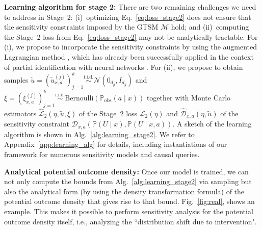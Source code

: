 \documentclass{article} %
\theoremstyle{definition}
\theoremstyle{plain}
\begin{document}
\textbf{Learning algorithm for stage 2:} There are two remaining challenges we need to address in Stage~2: (i)~optimizing Eq.~\eqref{eq:loss_stage2} does not ensure that the sensitivity constraints imposed by the GTSM $\mathcal{M}$ hold; and (ii)~computing the Stage~2 loss from Eq.~\eqref{eq:loss_stage2} may not be analytically tractable. For (i), we propose to incorporate the sensitivity constraints by using the augmented Lagrangian method \citep{Nocedal.2006}, which has already been successfully applied in the context of partial identification with neural networks \citep{Padh.2023}. For (ii), we propose to obtain samples $\widetilde{u} = (\widetilde{u}^{(j)}_{x, a})_{j=1}^k \overset{\text{i.i.d.}}{\sim} \mathcal{N}(0_{d_y}, I_{d_y})$ and $\xi = (\xi^{(j)}_{x, a})_{j=1}^k \overset{\text{i.i.d.}}{\sim} \mathrm{Bernoulli}(\mathbb{P}_\mathrm{obs}(a \mid x))$ together with Monte Carlo estimators $\hat{\mathcal{L}}_2(\eta, \widetilde{u}, \xi)$ of the Stage~2 loss $\mathcal{L}_2(\eta)$ and $\hat{\mathcal{D}}_{x, a}(\eta, \widetilde{u})$ of the sensitivity constraint $\mathcal{D}_{x, a}(\mathbb{P}(U \mid x), \mathbb{P}(U \mid x, a))$. A sketch of the learning algorithm is shown in Alg.~\ref{alg:learning_stage2}. We refer to Appendix~\ref{app:learning_alg} for details, including instantiations of our framework for numerous sensitivity models and causal queries.

\textbf{Analytical potential outcome density:} Once our model is trained, we can not only compute the bounds from Alg.~\ref{alg:learning_stage2} via sampling but also the analytical form (by using the density transformation formula) of the potential outcome density that gives rise to that bound. Fig.~\ref{fig:real}, shows an example. This makes it possible to perform sensitivity analysis for the potential outcome density itself, i.e., analyzing the ``distribution shift due to intervention".

\end{document}

